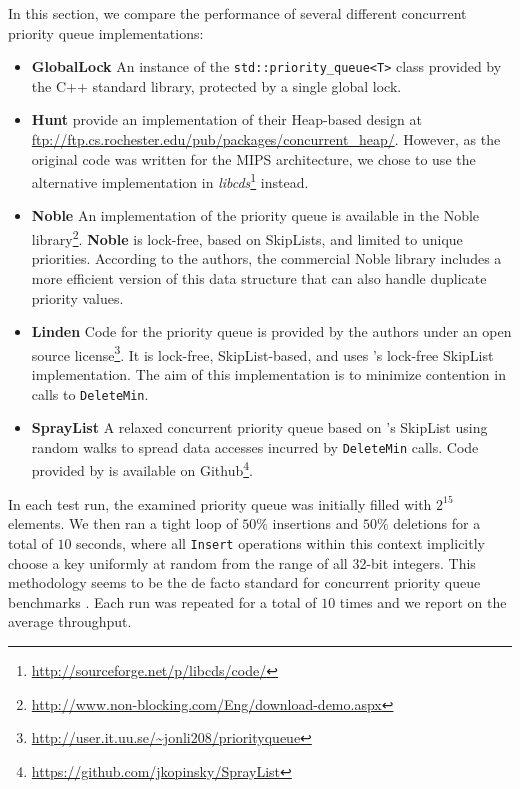 \documentclass[a4paper,10pt]{article}
\begin{document}
In this section, we compare the performance of several different concurrent priority
queue implementations:

\begin{itemize}
\item \textbf{GlobalLock} An instance of the \lstinline|std::priority_queue<T>| class provided
      by the C++ standard library, protected by a single global lock.
\item \textbf{Hunt} \citeauthor{hunt1996efficient} provide an implementation
      of their Heap-based design \cite{hunt1996efficient} at \url{ftp://ftp.cs.rochester.edu/pub/packages/concurrent_heap/}.
      However, as the original code was written for the MIPS architecture, we chose to
      use the alternative implementation in \emph{libcds}\footnote{\url{http://sourceforge.net/p/libcds/code/}}
      instead.
\item \textbf{Noble} An implementation of the \citeauthor{sundell2003fast} priority queue \cite{sundell2003fast}
      is available in the Noble library\footnote{\url{http://www.non-blocking.com/Eng/download-demo.aspx}}.
      \textbf{Noble} is lock-free, based on SkipLists, and limited to unique priorities.
      According to the authors, the commercial Noble library includes a more efficient
      version of this data structure that can also handle duplicate priority values.
\item \textbf{Linden} Code for the \citeauthor{linden2013skiplist} priority queue \cite{linden2013skiplist}
      is provided by the authors under an open source license\footnote{\url{http://user.it.uu.se/~jonli208/priorityqueue}}.
      It is lock-free, SkipList-based, and uses \citeauthor{fraser2004practical}'s lock-free
      SkipList implementation. The aim of this implementation is to minimize contention in
      calls to \lstinline|DeleteMin|.
\item \textbf{SprayList} A relaxed concurrent priority queue based on \citeauthor{fraser2004practical}'s
      SkipList using random walks to spread data accesses
      incurred by \lstinline|DeleteMin| calls. Code provided by \citeauthor{alistarhspraylist} is
      available on Github\footnote{\url{https://github.com/jkopinsky/SprayList}}.
\end{itemize}

In each test run, the examined priority queue was initially filled with $2^{15}$
elements. We then ran a tight loop of $50\%$ insertions and $50\%$ deletions
for a total of $10$ seconds, where all \lstinline|Insert|
operations within this context implicitly choose a key uniformly at random from
the range of all 32-bit integers. This methodology seems to be the de facto standard for concurrent %
priority queue benchmarks
\cite{alistarhspraylist,linden2013skiplist,shavit2000skiplist,sundell2003fast}.
Each run was repeated for a total of $10$ times
and we report on the average throughput.
\end{document}
